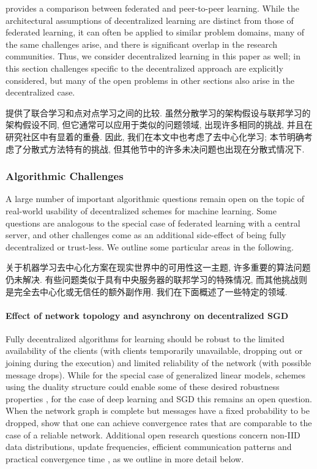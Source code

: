  provides a comparison between federated and peer-to-peer learning. While the architectural assumptions of decentralized learning are distinct from those of federated learning, it can often be applied to similar problem domains, many of the same challenges arise, and there is significant overlap in the research communities. Thus, we consider decentralized learning in this paper as well; in this section challenges specific to the decentralized approach are explicitly considered, but many of the open problems in other sections also arise in the decentralized case.

 提供了联合学习和点对点学习之间的比较. 虽然分散学习的架构假设与联邦学习的架构假设不同, 但它通常可以应用于类似的问题领域, 出现许多相同的挑战, 并且在研究社区中有显着的重叠. 因此, 我们在本文中也考虑了去中心化学习; 本节明确考虑了分散式方法特有的挑战, 但其他节中的许多未决问题也出现在分散式情况下.
\subsubsection{Algorithmic Challenges}
A large number of important algorithmic questions remain open on the topic of real-world usability of decentralized schemes for machine learning. Some questions are analogous to the special case of federated learning with a central server, and other challenges come as an additional side-effect of being fully decentralized or trust-less. We outline some particular areas in the following.

关于机器学习去中心化方案在现实世界中的可用性这一主题, 许多重要的算法问题仍未解决. 有些问题类似于具有中央服务器的联邦学习的特殊情况, 而其他挑战则是完全去中心化或无信任的额外副作用. 我们在下面概述了一些特定的领域.
\paragraph{Effect of network topology and asynchrony on decentralized SGD}
Fully decentralized algorithms for learning should be robust to the limited availability of the clients (with clients temporarily unavailable, dropping out or joining during the execution) and limited reliability of the network (with possible message drops). While for the special case of generalized linear models, schemes using the duality structure could enable some of these desired robustness properties \citep{he2018cola}, for the case of deep learning and SGD this remains an open question.
When the network graph is complete but messages have a fixed probability to be dropped, \citet{yu2018distributed} show that one can achieve convergence rates that are comparable to the case of a reliable network.
Additional open research questions concern non-IID data distributions, update frequencies, efficient communication patterns and practical convergence time \citep{Tang2018}, as we outline in more detail below.

